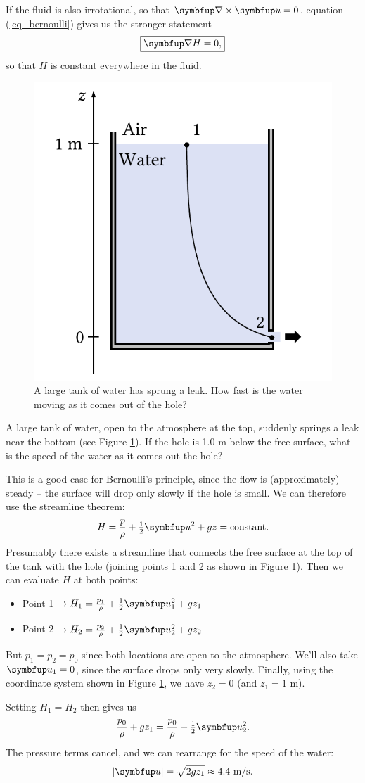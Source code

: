 If the fluid is also irrotational, so that $\curl \uu = 0$, equation (\ref{eq_bernoulli}) gives us the stronger statement
\begin{equation}
\boxed{
\grad H = 0,
}
\end{equation}
so that $H$ is constant everywhere in the fluid.

\begin{figure}
\centering\includegraphics[width=0.5\linewidth]{Figures/Chapter3/fig_leaky_bucket}
\caption{A large tank of water has sprung a leak.  How fast is the water moving as it comes out of the hole?}
\label{fig_leaky_bucket}
\end{figure}

\begin{example}
A large tank of water, open to the atmosphere at the top, suddenly springs a leak near the bottom (see Figure \ref{fig_leaky_bucket}).  If the hole is 1.0 m below the free surface, what is the speed of the water as it comes out the hole?

This is a good case for Bernoulli's principle, since the flow is (approximately) steady -- the surface will drop only slowly if the hole is small.  We can therefore use the streamline theorem:
\[
H = \frac{p}{\rho} + \tfrac{1}{2} \uu^2 + gz = \text{constant}.
\]
Presumably there exists a streamline that connects the free surface at the top of the tank with the hole (joining points 1 and 2 as shown in Figure \ref{fig_leaky_bucket}).  Then we can evaluate $H$ at both points:
\begin{itemize}
\item Point 1 $\to H_1 = \frac{p_1}{\rho} + \tfrac{1}{2} \uu_1^2 + gz_1$
\item Point 2 $\to H_2 = \frac{p_2}{\rho} + \tfrac{1}{2} \uu_2^2 + gz_2$
\end{itemize}
But $p_1 = p_2 = p_0$ since both locations are open to the atmosphere.  We'll also take $\uu_1 = 0$, since the surface drops only very slowly.  Finally, using the coordinate system shown in Figure \ref{fig_leaky_bucket}, we have $z_2 = 0$ (and $z_1 = 1$ m).

Setting $H_1 = H_2$ then gives us
\[
\frac{p_0}{\rho} + gz_1 = \frac{p_0}{\rho} + \tfrac{1}{2} \uu_2^2.
\]
The pressure terms cancel, and we can rearrange for the speed of the water:
\[
|\uu| = \sqrt{2gz_1} \approx 4.4 \text{ m/s}.
\]
\end{example}






